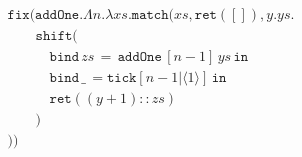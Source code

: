 $$
\begin{array}{l}
\texttt{fix}(\texttt{addOne}.\Lambda n.\lambda xs.\texttt{match}(xs,\texttt{ret}([]),y.ys.\\[-2mm]
  \hspace{2em} \texttt{shift}(\\[-2mm]
  \hspace{3em} \texttt{bind} \, zs \, = \, \texttt{addOne} \, [n-1] \, ys \, \texttt{in}\\[-2mm]
  \hspace{3em} \texttt{bind} \, \_ \, =  \texttt{tick}[n-1|\langle 1 \rangle] \, \texttt{in}\\[-2mm]
  \hspace{3em} \texttt{ret}((y+1)::zs)\\[-2mm]
  \hspace{2em})\\[-2mm]
))
\end{array}
$$